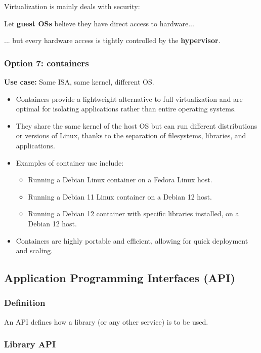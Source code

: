 \documentclass[12pt]{article}
\begin{document}
Virtualization is mainly deals with security:

Let \textbf{guest OSs} believe they have direct access to hardware...

... but every hardware access is tightly controlled by the \textbf{hypervisor}.

\subsubsection{Option 7: containers}
\textbf{Use case:} Same ISA, same kernel, different OS.

\begin{itemize}
    \item Containers provide a lightweight alternative to full virtualization and are optimal for isolating applications rather than entire operating systems.
    \item They share the same kernel of the host OS but can run different distributions or versions of Linux, thanks to the separation of filesystems, libraries, and applications.
    \item Examples of container use include:
    \begin{itemize}
        \item Running a Debian Linux container on a Fedora Linux host.
        \item Running a Debian 11 Linux container on a Debian 12 host.
        \item Running a Debian 12 container with specific libraries installed, on a Debian 12 host.
    \end{itemize}
    \item Containers are highly portable and efficient, allowing for quick deployment and scaling.
\end{itemize}


\subsection{Application Programming Interfaces (API)}

\subsubsection{Definition}
An API defines how a library (or any other service) is to be used.


\subsubsection{Library API}
\end{document}
